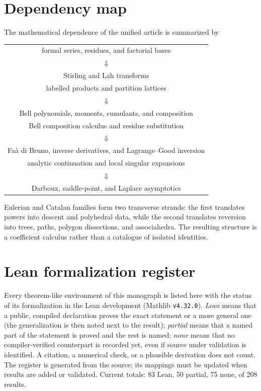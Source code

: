 \documentclass[11pt,a4paper,oneside,openany]{book}
\theoremstyle{definition}
\theoremstyle{remark}
\begin{document}
\section{Dependency map}
The mathematical dependence of the unified article is summarized by
\begin{center}
\renewcommand{\arraystretch}{1.15}
\begin{tabular}{c}
formal series, residues, and factorial bases\\
$\Downarrow$\\
Stirling and Lah transforms\\[1mm]
labelled products and partition lattices\\
$\Downarrow$\\
Bell polynomials, moments, cumulants, and composition\\[1mm]
Bell composition calculus and residue substitution\\
$\Downarrow$\\
Fa\`a di Bruno, inverse derivatives, and Lagrange--Good inversion\\[1mm]
analytic continuation and local singular expansions\\
$\Downarrow$\\
Darboux, saddle-point, and Laplace asymptotics
\end{tabular}
\renewcommand{\arraystretch}{1}
\end{center}
Eulerian and Catalan families form two transverse strands: the first translates
powers into descent and polyhedral data, while the second translates reversion into
trees, paths, polygon dissections, and associahedra.  The resulting structure is a
coefficient calculus rather than a catalogue of isolated identities.

\section{Lean formalization register}
\label{sec:lean-register}
Every theorem-like environment of this monograph is listed here with the status of its formalization in the Lean development  (Mathlib \texttt{v4.32.0}).  \emph{Lean} means that a public, compiled declaration proves the exact statement or a more general one (the generalization is then noted next to the result); \emph{partial} means that a named part of the statement is proved and the rest is named; \emph{none} means that no compiler-verified counterpart is recorded yet, even if source under validation is identified.  A citation, a numerical check, or a plausible derivation does not count.  The register is generated from the source; its mappings must be updated when results are added or validated.  Current totals: 83 Lean, 50 partial, 75 none, of 208 results.
\end{document}
